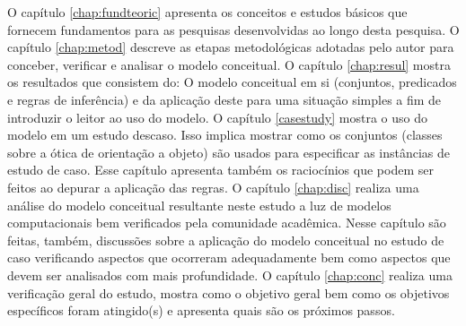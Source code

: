 O capítulo \ref{chap:fundteoric} apresenta os conceitos e estudos básicos que fornecem fundamentos para as pesquisas desenvolvidas ao longo desta pesquisa. O capítulo \ref{chap:metod} descreve as etapas metodológicas adotadas pelo autor para conceber, verificar e analisar o modelo conceitual. O capítulo \ref{chap:resul} mostra os resultados que consistem do: O modelo conceitual em si (conjuntos, predicados e regras de inferência) e da aplicação deste para uma situação simples a fim de introduzir o leitor ao uso do modelo. O capítulo \ref{casestudy} mostra o uso do modelo em um estudo descaso. Isso implica mostrar como os conjuntos (classes sobre a ótica de orientação a objeto) são usados para especificar as instâncias de estudo de caso. Esse capítulo apresenta também os raciocínios que podem ser feitos ao depurar a aplicação das regras. O capítulo \ref{chap:disc} realiza uma análise do modelo conceitual resultante neste estudo a luz de modelos computacionais bem verificados pela comunidade acadêmica. Nesse capítulo são feitas, também, discussões sobre a aplicação do modelo conceitual no estudo de caso verificando aspectos que ocorreram adequadamente bem como aspectos que devem ser analisados com mais profundidade. O capítulo \ref{chap:conc} realiza uma verificação geral do estudo, mostra como o objetivo geral bem como os objetivos específicos foram atingido(s) e apresenta quais são os próximos passos. 